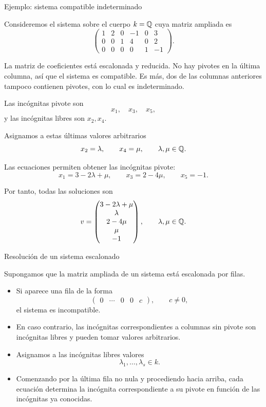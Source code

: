 \begin{frame}[allowframebreaks, t]{Ejemplo: sistema compatible indeterminado}

Consideremos el sistema sobre el cuerpo $k=\mathbb{Q}$ cuya matriz ampliada es
\[
\left(
\begin{array}{ccccc|c}
1&2&0&-1&0&3\\
0&0&1&4&0&2\\
0&0&0&0&1&-1
\end{array}
\right).
\]

La matriz de coeficientes está escalonada y reducida. No hay pivotes en la última columna, así que el sistema es compatible. Es más, dos de las columnas anteriores tampoco contienen pivotes, con lo cual es indeterminado.

\medskip

Las incógnitas
pivote son
\[
x_1,\quad x_3,\quad x_5,
\]
y las incógnitas libres son \(x_2,x_4\).

Asignamos a estas últimas valores arbitrarios
\[
x_2=\lambda,\qquad x_4=\mu,
\qquad \lambda,\mu\in \mathbb{Q}.
\]

Las ecuaciones permiten obtener las incógnitas pivote:
\[
x_1=3-2\lambda+\mu,\qquad
x_3=2-4\mu,\qquad
x_5=-1.
\]

Por tanto, todas las soluciones son
\[
v=
\begin{pmatrix}
3-2\lambda+\mu\\
\lambda\\
2-4\mu\\
\mu\\
-1
\end{pmatrix}
,
\qquad \lambda,\mu\in \mathbb{Q}.
\]

\end{frame}


\begin{frame}{Resolución de un sistema escalonado}

Supongamos que la matriz ampliada de un sistema está
\alert{escalonada por filas}.

\begin{itemize}
\item Si aparece una fila de la forma
\[
\left(
\begin{array}{cccc|c}
0&\cdots&0&0&c
\end{array}
\right),
\qquad c\neq0,
\]
el sistema es incompatible.

\item En caso contrario, las incógnitas correspondientes a columnas
sin pivote son \alert{incógnitas libres} y pueden tomar valores
arbitrarios.

\item Asignamos a las incógnitas libres valores
\[
\lambda_1,\ldots,\lambda_s\in k.
\]

\item Comenzando por la última fila no nula y procediendo hacia arriba,
cada ecuación determina la incógnita correspondiente a su pivote
en función de las incógnitas ya conocidas.
\end{itemize}

\end{frame}

